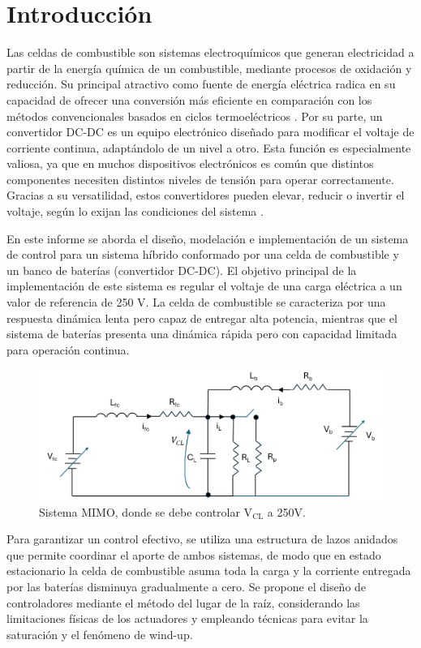 \section{Introducción}
Las celdas de combustible son sistemas electroquímicos que generan electricidad a partir de la energía química de un combustible, mediante procesos de oxidación y reducción. Su principal atractivo como fuente de energía eléctrica radica en su capacidad de ofrecer una conversión más eficiente en comparación con los métodos convencionales basados en ciclos termoeléctricos \cite{cec}. Por su parte, un convertidor DC-DC es un equipo electrónico diseñado para modificar el voltaje de corriente continua, adaptándolo de un nivel a otro. Esta función es especialmente valiosa, ya que en muchos dispositivos electrónicos es común que distintos componentes necesiten distintos niveles de tensión para operar correctamente. Gracias a su versatilidad, estos convertidores pueden elevar, reducir o invertir el voltaje, según lo exijan las condiciones del sistema \cite{juanito}.

En este informe se aborda el diseño, modelación e implementación de un sistema de control para un sistema híbrido conformado por una celda de combustible y un banco de baterías (convertidor DC-DC). El objetivo principal de la implementación de este sistema es regular el voltaje de una carga eléctrica a un valor de referencia de 250 V. La celda de combustible se caracteriza por una respuesta dinámica lenta pero capaz de entregar alta potencia, mientras que el sistema de baterías presenta una dinámica rápida pero con capacidad limitada para operación continua.

\begin{figure}
    \centering
    \includegraphics[width=0.7\linewidth]{img/circuito.png}
    \caption{Sistema MIMO, donde se debe controlar V$_{\text{CL}}$ a 250V.}
    \label{fig:circuito}
\end{figure}

Para garantizar un control efectivo, se utiliza una estructura de lazos anidados que permite coordinar el aporte de ambos sistemas, de modo que en estado estacionario la celda de combustible asuma toda la carga y la corriente entregada por las baterías disminuya gradualmente a cero. Se propone el diseño de controladores mediante el método del lugar de la raíz, considerando las limitaciones físicas de los actuadores y empleando técnicas para evitar la saturación y el fenómeno de wind-up.

